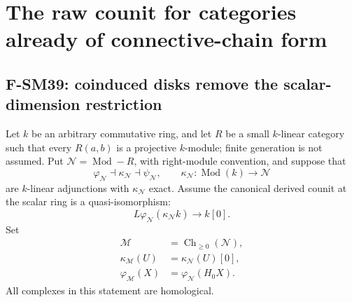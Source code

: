 \section{The raw counit for categories already of connective-chain form}

\subsection{F-SM39: coinduced disks remove the scalar-dimension restriction}

Let \(k\) be an arbitrary commutative ring, and let \(R\) be a
small \(k\)-linear category such that every \(R(a,b)\) is a
projective \(k\)-module; finite generation is not assumed.
Put \(\mathcal N=\operatorname{Mod}\!-\!R\), with right-module
convention, and suppose that
\[
 \varphi_{\mathcal N}\dashv\kappa_{\mathcal N}\dashv
 \psi_{\mathcal N},\qquad
 \kappa_{\mathcal N}:\operatorname{Mod}(k)\longrightarrow\mathcal N
                                                               \tag{SM39.1}
\]
are \(k\)-linear adjunctions with \(\kappa_{\mathcal N}\) exact.
Assume the canonical derived counit at the scalar ring is a
quasi-isomorphism:
\[
       L\varphi_{\mathcal N}(\kappa_{\mathcal N}k)
                         \longrightarrow k[0].              \tag{SM39.2}
\]
Set
\[
 \begin{aligned}
 \mathcal M&=\operatorname{Ch}_{\ge0}(\mathcal N),\\
 \kappa_{\mathcal M}(U)&=\kappa_{\mathcal N}(U)[0],\\
 \varphi_{\mathcal M}(X)&=\varphi_{\mathcal N}(H_0X).
 \end{aligned}                                               \tag{SM39.3}
\]
All complexes in this statement are homological.

